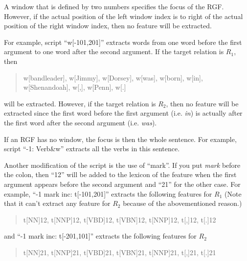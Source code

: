 \documentclass[11pt]{article}
\begin{document}
A window that is defined by two numbers specifies the focus
of the RGF.  However, if the actual position of the left window index is to right
of the actual position of the right window index, then no feature will be extracted.

For example, script ``w[-101,201]'' extracts words from one word before the first 
argument to one word after the second argument.  If the target relation is $R_1$, then
\begin{quote} 
\begin{small}
w[bandleader], w[Jimmy], w[Dorsey], w[was], w[born], w[in], w[Shenandoah], w[,], w[Penn], w[.]
\end{small}
\end{quote}
will be extracted.  However, if the target relation is $R_2$, then no feature will be
extracted since the first word before the first argument (i.e. \emph{in}) is actually after 
the first word after the second argument (i.e. \emph{was}).

If an RGF has no window, the focus is then the whole sentence.
For example, script ``-1: Verb\&w'' extracts all the verbs in this sentence.

Another modification of the script is the use of ``mark''.  If you put \emph{mark} before
the colon, then ``12'' will be added to the lexicon of the feature when  the first argument appears
before the second argument and ``21'' for the other case. For example,
``-1 mark inc: t[-101,201]''
extracts the following features for $R_1$ (Note that
it can't extract any feature for $R_2$ because of the
abovementioned reason.)
\begin{quote} 
t[NN]12, t[NNP]12, t[VBD]12, t[VBN]12, t[NNP]12, t[,]12, t[.]12 
\end{quote}
and ``-1 mark inc: t[-201,101]'' extracts the following features for $R_2$
\begin{quote}
t[NN]21, t[NNP]21, t[VBD]21, t[VBN]21, t[NNP]21, t[,]21, t[.]21
\end{quote}
\end{document}
